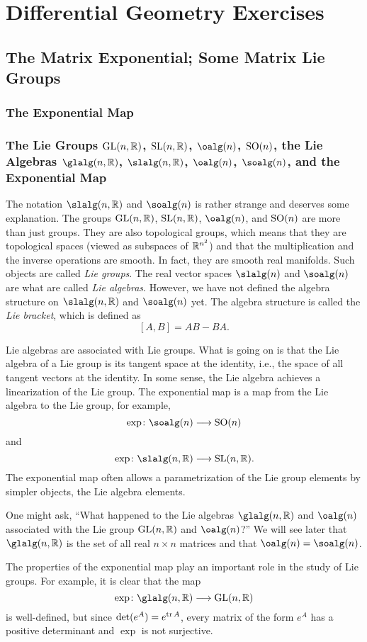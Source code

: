 \chapter{Differential Geometry Exercises}
\section{The Matrix Exponential; Some Matrix Lie Groups}
\subsection{The Exponential Map}
\subsection{The Lie Groups $\mathrm{GL}(n,\mathbb{R})$, $\mathrm{SL}(n,\mathbb{R})$, $\oalg(n)$,
  $\mathrm{SO}(n)$, the Lie Algebras $\glalg(n,\bbR)$, $\slalg(n,\bbR)$,
  $\oalg(n)$, $\soalg(n)$, and the Exponential Map}
The notation $\slalg(n,\bbR)$ and $\soalg(n)$ is rather strange and
deserves some explanation. The groups $\mathrm{GL}(n,\mathbb{R})$, $\mathrm{SL}(n,\mathbb{R})$,
$\oalg(n)$, and $\mathrm{SO}(n)$ are more than just groups. They are also
topological groups, which means that they are topological spaces (viewed as
subspaces of $\mathbb{R}^{n^2}$) and that the multiplication and the inverse
operations are smooth. In fact, they are smooth real manifolds. Such
objects are called \emph{Lie groups}. The real vector spaces $\slalg(n)$
and $\soalg(n)$ are what are called \emph{Lie algebras}. However, we have
not defined the algebra structure on $\slalg(n,\bbR)$ and $\soalg(n)$
yet. The algebra structure is called the \emph{Lie bracket}, which is
defined as
\[
[A,B]=AB-BA.
\]

Lie algebras are associated with Lie groups. What is going on is that the
Lie algebra of a Lie group is its tangent space at the identity, i.e., the
space of all tangent vectors at the identity. In some sense, the Lie
algebra achieves a linearization of the Lie group. The exponential map is a
map from the Lie algebra to the Lie group, for example,
\[
\exp\colon\soalg(n)\longrightarrow\SO(n)
\]
and
\[
\exp\colon\slalg(n,\bbR)\longrightarrow\SL(n,\bbR).
\]
The exponential map often allows a parametrization of the Lie group
elements by simpler objects, the Lie algebra elements.

One might ask, ``What happened to the Lie algebras $\glalg(n,\bbR)$ and
$\oalg(n)$ associated with the Lie group $\mathrm{GL}(n,\mathbb{R})$ and $\oalg(n)$?'' We
will see later that $\glalg(n,\bbR)$ is the set of all real $n\times n$
matrices and that $\oalg(n)=\soalg(n)$.

The properties of the exponential map play an important role in the study
of Lie groups. For example, it is clear that the map
\[
\exp\colon\glalg(n,\bbR)\longrightarrow\GL(n,\bbR)
\]
is well-defined, but since $\det(e^A)=e^{\operatorname{tr} A}$, every matrix of the form
$e^A$ has a positive determinant and $\exp$ is not surjective.

